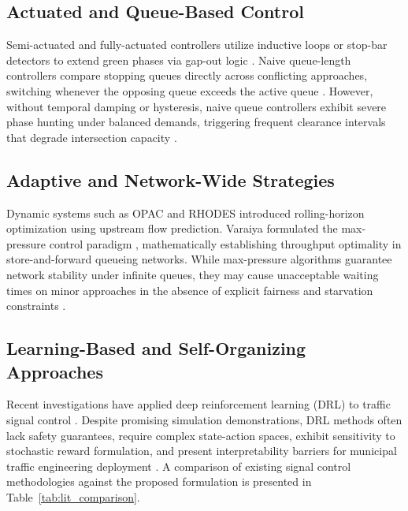\documentclass[11pt,journal,onecolumn]{article}
\begin{document}
\subsection{Actuated and Queue-Based Control}
Semi-actuated and fully-actuated controllers utilize inductive loops or stop-bar detectors to extend green phases via gap-out logic \cite{nema2005ts2}. Naive queue-length controllers compare stopping queues directly across conflicting approaches, switching whenever the opposing queue exceeds the active queue \cite{miller1963computer}. However, without temporal damping or hysteresis, naive queue controllers exhibit severe phase hunting under balanced demands, triggering frequent clearance intervals that degrade intersection capacity \cite{gershenson2005self}.

\subsection{Adaptive and Network-Wide Strategies}
Dynamic systems such as OPAC \cite{gartner1983opac} and RHODES \cite{mirchandani2001real} introduced rolling-horizon optimization using upstream flow prediction. Varaiya formulated the max-pressure control paradigm \cite{varaiya2013max}, mathematically establishing throughput optimality in store-and-forward queueing networks. While max-pressure algorithms guarantee network stability under infinite queues, they may cause unacceptable waiting times on minor approaches in the absence of explicit fairness and starvation constraints \cite{kouvelas2014maximum}.

\subsection{Learning-Based and Self-Organizing Approaches}
Recent investigations have applied deep reinforcement learning (DRL) to traffic signal control \cite{arel2010reinforcement, wei2018intellilight, wei2019survey}. Despite promising simulation demonstrations, DRL methods often lack safety guarantees, require complex state-action spaces, exhibit sensitivity to stochastic reward formulation, and present interpretability barriers for municipal traffic engineering deployment \cite{genders2016using}. A comparison of existing signal control methodologies against the proposed formulation is presented in Table~\ref{tab:lit_comparison}.
\end{document}
